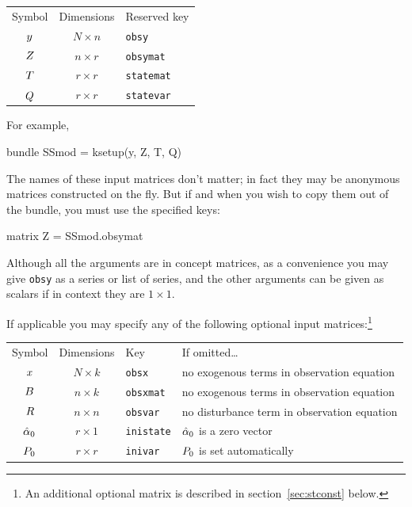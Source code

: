 \begin{center}
\begin{tabular}{ccl}
Symbol & Dimensions & Reserved key \\[6pt]
$y$    & $N \times n$ & \texttt{obsy}\\
$Z$   & $n \times r$ & \texttt{obsymat}\\
$T$  & $r \times r$ & \texttt{statemat}\\
$Q$  & $r \times r$ & \texttt{statevar}\\
\end{tabular}
\end{center}

For example,
\begin{code}
bundle SSmod = ksetup(y, Z, T, Q)
\end{code}

The names of these input matrices don't matter; in fact they may be
anonymous matrices constructed on the fly. But if and when you wish to
copy them out of the bundle, you must use the specified keys:
\begin{code}
matrix Z = SSmod.obsymat
\end{code}

Although all the arguments are in concept matrices, as a convenience
you may give \texttt{obsy} as a series or list of series, and the
other arguments can be given as scalars if in context they are
$1 \times 1$.

If applicable you may specify any of the following optional input
matrices:\footnote{An additional optional matrix is described in
section~\ref{sec:stconst} below.}

\begin{center}
\begin{tabular}{ccll}
Symbol & Dimensions & Key & If omitted\dots \\[6pt]
$x$ & $N \times k$ & \texttt{obsx} &
 no exogenous terms in observation equation\\
$B$ & $n \times k$ & \texttt{obsxmat} &
 no exogenous terms in observation equation\\
$R$ & $n \times n$ & \texttt{obsvar} &
 no disturbance term in observation equation \\
$\hat{\alpha}_0$ & $r \times 1$ & \texttt{inistate} &
 $\hat{\alpha}_0$ is a zero vector\\
$P_0$ & $r \times r$ & \texttt{inivar} &
 $P_0$ is set automatically
\end{tabular}
\end{center}

